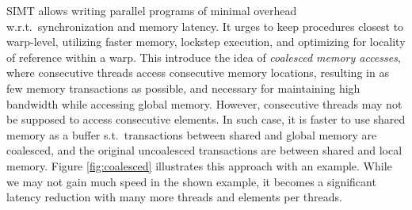 SIMT allows writing parallel programs of minimal overhead w.r.t.\
synchronization and memory latency. It urges to keep procedures closest to
warp-level, utilizing faster memory, lockstep execution, and optimizing for
locality of reference within a warp. This introduce the idea of
\textit{coalesced memory accesses}, where consecutive threads access consecutive
memory locations, resulting in as few memory transactions as possible, and
necessary for maintaining high bandwidth while accessing global memory. However,
consecutive threads may not be supposed to access consecutive elements. In such
case, it is faster to use shared memory as a buffer s.t.\ transactions between
shared and global memory are coalesced, and the original uncoalesced
transactions are between shared and local memory. Figure \ref{fig:coalesced}
illustrates this approach with an example. While we may not gain much speed in
the shown example, it becomes a significant latency reduction with many more
threads and elements per threads.

